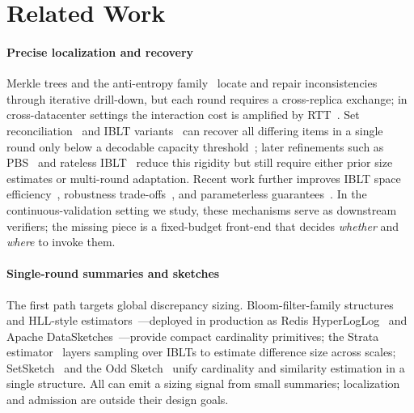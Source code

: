 \section{Related Work}
\label{sec:related}

\paragraph{Precise localization and recovery}
Merkle trees and the anti-entropy
family~\cite{merkle1987digital,demers1987epidemic,vanrenesse1998gossip,vanrenesse2008reconciliation}
locate and repair inconsistencies through iterative drill-down,
but each round requires a cross-replica exchange; in
cross-datacenter settings the interaction cost is amplified
by RTT~\cite{vogels2009eventually,terry1995managing}.
Set reconciliation~\cite{minsky2003set} and IBLT
variants~\cite{eppstein2011difference,goodrich2011invertible}
can recover all differing items in a single round only below a
decodable capacity threshold~\cite{aldridge2019group}; later
refinements such as PBS~\cite{gong2021pbs} and rateless
IBLT~\cite{yang2024rateless} reduce this rigidity but still
require either prior size estimates or multi-round adaptation.
Recent work further improves IBLT space                        
efficiency~\cite{fleischhacker2024iblt}, robustness            
trade-offs~\cite{belazzougui2024reconciliation}, and           
parameterless  guarantees~\cite{keniagin2025certainsync}.                     
In the continuous-validation setting we study, these
mechanisms serve as downstream verifiers; the missing piece is
a fixed-budget front-end that decides \emph{whether} and
\emph{where} to invoke them.

\paragraph{Single-round summaries and sketches} 
The first path targets global discrepancy sizing.
Bloom-filter-family structures~\cite{bloom1970space,fan2014cuckoo,
dillinger2021ribbon,broder2004network} and HLL-style
estimators~\cite{flajolet2007hyperloglog,heule2013hyperloglog}---deployed
in production as Redis HyperLogLog~\cite{sanfilippo2014redis} and
Apache DataSketches~\cite{datasketches2024frequent}---provide compact
cardinality primitives;
the Strata estimator~\cite{eppstein2011difference} layers
sampling over IBLTs to estimate difference size across scales;
SetSketch~\cite{ertl2021setsketch} and the Odd
Sketch~\cite{mitzenmacher2014odd} unify cardinality and
similarity estimation in a single structure.
All can emit a sizing signal from small summaries;
localization and admission are outside their design goals.

